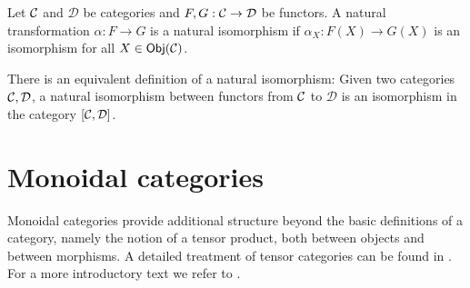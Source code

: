 	\begin{defn}
		Let ${\mathcal{C}}$ and $\mathcal{D}$ be categories and $F,G:{\mathcal{C}}\to\mathcal{D}$ be functors. A natural transformation $\alpha:F\to G$ is a natural isomorphism if $\alpha_X:F(X)\to G(X)$ is an isomorphism for all $X\in\mathsf{Obj}({\mathcal{C}})$.
	\end{defn}

	\begin{rem}
		There is an equivalent definition of a natural isomorphism: Given two categories ${\mathcal{C}},\mathcal{D}$, a natural isomorphism between functors from ${\mathcal{C}}$ to $\mathcal{D}$ is an isomorphism in the category $[{\mathcal{C}},\mathcal{D}]$.
	\end{rem}



\section{Monoidal categories}

	Monoidal categories provide additional structure beyond the basic definitions of a category, namely the notion of a tensor product, both between objects and between morphisms. A detailed treatment of tensor categories can be found in \cite{Etingof2015}. For a more introductory text we refer to \cite{bakalov_lectures_2001}.
	
